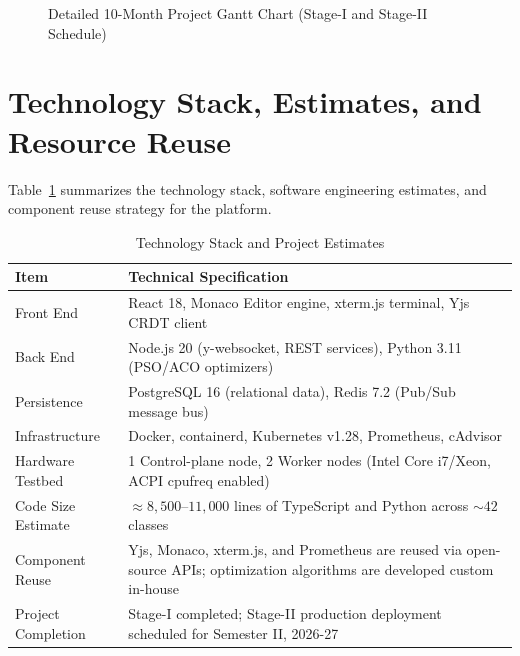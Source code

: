 \documentclass[12pt,a4paper]{report}
\begin{document}
\begin{figure}[H]
{}
\caption{Detailed 10-Month Project Gantt Chart (Stage-I and Stage-II Schedule)}
\label{fig:gantt_chart}
\end{figure}

\section{Technology Stack, Estimates, and Resource Reuse}
Table~\ref{tab:stack} summarizes the technology stack, software engineering estimates, and component reuse strategy for the platform.

\begin{table}[H]
\centering
\caption{Technology Stack and Project Estimates}
\label{tab:stack}
\begin{tabularx}{\linewidth}{@{}p{3.5cm}X@{}}
\toprule
\textbf{Item} & \textbf{Technical Specification} \\ \midrule
Front End & React 18, Monaco Editor engine, xterm.js terminal, Yjs CRDT client \\
Back End & Node.js 20 (y-websocket, REST services), Python 3.11 (PSO/ACO optimizers) \\
Persistence & PostgreSQL 16 (relational data), Redis 7.2 (Pub/Sub message bus) \\
Infrastructure & Docker, containerd, Kubernetes v1.28, Prometheus, cAdvisor \\
Hardware Testbed & 1 Control-plane node, 2 Worker nodes (Intel Core i7/Xeon, ACPI cpufreq enabled) \\
Code Size Estimate & $\approx 8,500$--$11,000$ lines of TypeScript and Python across $\sim 42$ classes \\
Component Reuse & Yjs, Monaco, xterm.js, and Prometheus are reused via open-source APIs; optimization algorithms are developed custom in-house \\
Project Completion & Stage-I completed; Stage-II production deployment scheduled for Semester II, 2026-27 \\ \bottomrule
\end{tabularx}
\end{table}
\end{document}
